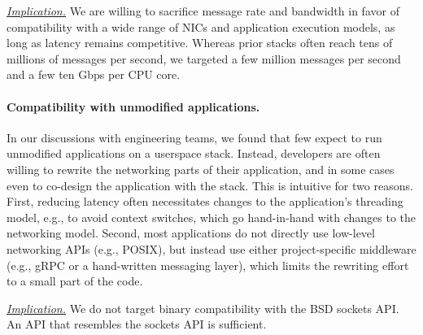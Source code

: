 \ul{\textit{Implication.}} We are willing to sacrifice message rate and bandwidth in favor of compatibility with a wide range of NICs and application execution models, as long as latency remains competitive.
Whereas prior stacks often reach tens of millions of messages per second, we targeted a few million messages per second and a few ten Gbps per CPU core.

\paragraph{Compatibility with unmodified applications.}
In our discussions with engineering teams, we found that few expect to run unmodified applications on a userspace stack.
Instead, developers are often willing to rewrite the networking parts of their application, and in some cases even to co-design the application with the stack.
This is intuitive for two reasons.
First, reducing latency often necessitates changes to the application's threading model, e.g., to avoid context switches, which go hand-in-hand with changes to the networking model.
Second, most applications do not directly use low-level networking APIs (e.g., POSIX), but instead use either project-specific middleware (e.g., gRPC or a hand-written messaging layer), which limits the rewriting effort to a small part of the code.

\ul{\textit{Implication.}} We do not target binary compatibility with the BSD sockets API.
An API that resembles the sockets API is sufficient.


